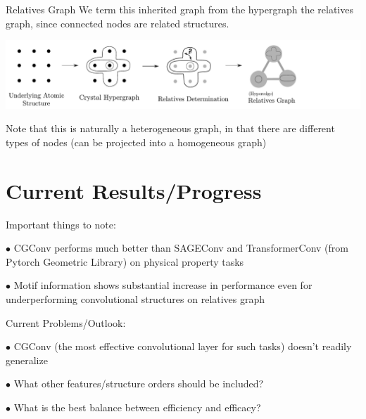 \documentclass[11pt]{beamer}
\begin{document}
\begin{frame}{Relatives Graph}
We term this inherited graph from the hypergraph the relatives graph, since connected nodes are related structures.
\begin{center}
\includegraphics[scale=0.33]{relgraph_workflow_horiz.pdf}
\end{center}

Note that this is naturally a heterogeneous graph, in that there are different types of nodes (can be projected into a homogeneous graph)
\end{frame}

\section{Current Results/Progress}
\begin{frame}
Important things to note:

\medskip

$\bullet$ CGConv performs much better than SAGEConv and TransformerConv (from Pytorch Geometric Library) on physical property tasks

\medskip

$\bullet$ Motif information shows substantial increase in performance even for underperforming convolutional structures on relatives graph
\end{frame}


\begin{frame}
Current Problems/Outlook:

\medskip

$\bullet$ CGConv (the most effective convolutional layer for such tasks) doesn't readily generalize

\medskip

$\bullet$ What other features/structure orders should be included?

\medskip

$\bullet$ What is the best balance between efficiency and efficacy?
\end{frame}
\end{document}
